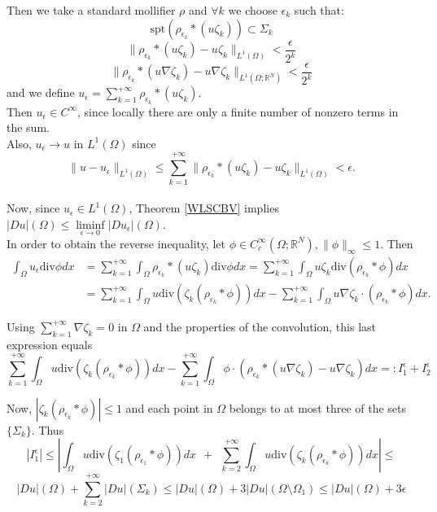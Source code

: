 Then we take a standard mollifier $\rho$ and $\forall k$  we choose $\epsilon_{k}$ such that:
\[ \mathrm{spt}(\rho_{\epsilon_{k}} \ast (u\zeta_{k})) \subset \Sigma_{k}\]
\[ \|\rho_{\epsilon_{k}} \ast (u\zeta_{k}) - u\zeta_{k}\|_{L^{1}(\Omega)} < \frac{\epsilon}{2^{k}}\]
\[ \|\rho_{\epsilon_{k}} \ast (u\nabla\zeta_{k}) - u\nabla\zeta_{k}\|_{L^{1}(\Omega; \mathbb{R}^{N})} < \frac{\epsilon}{2^{k}}\]
and we define $u_{\epsilon} = \sum_{k=1}^{+\infty} \rho_{\epsilon_{k}} \ast (u\zeta_{k})$. 
\\
Then $u_{\epsilon} \in C^{\infty}$, since locally there are only a finite number of nonzero terms in the sum.
\\
Also, $u_{\epsilon} \to u$ in $L^{1}(\Omega)$ since
\[ \|u - u_{\epsilon}\|_{L^{1}(\Omega)} \le \sum_{k = 1}^{+\infty} \|\rho_{\epsilon_{k}} \ast (u\zeta_{k}) - u\zeta_{k}\|_{L^{1}(\Omega)} < \epsilon. \]
\\
Now, since $u_{\epsilon} \in L^{1}(\Omega)$, Theorem \ref{WLSCBV} implies $|Du|(\Omega) \le \liminf\limits_{\epsilon \to 0} |Du_{\epsilon}|(\Omega)$.
\\

In order to obtain the reverse inequality, let $\phi \in C^{\infty}_{c}(\Omega; \mathbb{R}^{N}), \|\phi\|_{\infty} \le 1$. Then
\begin{align*} \int_{\Omega} u_{\epsilon} \mathrm{div}\phi dx & = \sum_{k=1}^{+\infty} \int_{\Omega} \rho_{\epsilon_{k}} \ast (u\zeta_{k}) \mathrm{div}\phi dx = \sum_{k=1}^{+\infty} \int_{\Omega} u \zeta_{k} \mathrm{div}(\rho_{\epsilon_{k}} \ast \phi) dx \\
& = \sum_{k=1}^{+\infty} \int_{\Omega} u \mathrm{div}(\zeta_{k} (\rho_{\epsilon_{k}} \ast \phi)) dx - \sum_{k=1}^{+\infty} \int_{\Omega} u \nabla \zeta_{k} \cdot (\rho_{\epsilon_{k}} \ast \phi) dx. 
\end{align*}

Using $\displaystyle \sum_{k = 1}^{+\infty} \nabla \zeta_{k} = 0$ in $\Omega$ and the properties of the convolution, this last expression equals
\[ \sum_{k=1}^{+\infty} \int_{\Omega} u \mathrm{div}(\zeta_{k} (\rho_{\epsilon_{k}} \ast \phi)) dx - \sum_{k=1}^{+\infty} \int_{\Omega} \phi \cdot (\rho_{\epsilon_{k}} \ast (u \nabla \zeta_{k}) - u \nabla \zeta_{k}) dx =: I_{1}^{\epsilon} + I_{2}^{\epsilon} \] 

Now, $|\zeta_{k}(\rho_{\epsilon_{k}} \ast \phi)| \le 1$ and each point in $\Omega$ belongs to at most three of the sets $\{\Sigma_{k}\}$. Thus
\[ |I_{1}^{\epsilon}| \le \left |\int_{\Omega} u \mathrm{div}(\zeta_{1} (\rho_{\epsilon_{1}} \ast \phi)) dx \ \ + \ \ \sum_{k=2}^{+\infty} \int_{\Omega} u \mathrm{div}(\zeta_{k} (\rho_{\epsilon_{k}} \ast \phi)) dx \right | \le \]
\[ |Du|(\Omega) + \sum_{k = 2}^{+\infty} |Du|(\Sigma_{k}) \le |Du|(\Omega) + 3|Du|(\Omega \setminus \Omega_{1}) \le |Du|(\Omega) + 3 \epsilon \]

